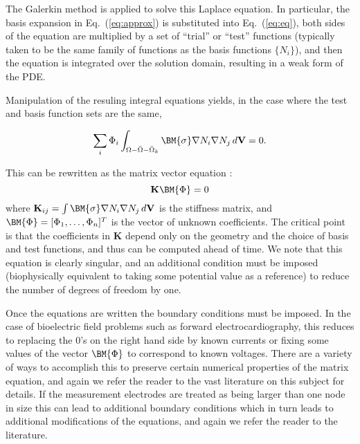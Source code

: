 The Galerkin method is applied to solve this Laplace equation. In
particular, the basis expansion in Eq.~(\ref{eq:approx}) is substituted
into Eq.~(\ref{eq:eq}), both sides of the equation are multiplied by a set
of ``trial'' or ``test'' functions (typically taken to be the same family of
functions as the basis functions $\{N_{i}\}$), and then the equation is
integrated over the solution domain, resulting in a weak form of the
PDE. 

Manipulation of the resuling integral equations yields, in the case where
the test and basis function sets are the same,

\begin{equation} \sum_i \Phi_i \int_{\Omega - \bar{\Omega} -
\bar{\Omega}_k} \BM{\sigma} \nabla N_i \nabla N_j \, d\mathbf{V} =
0. \label{eq:int_eq}
\end{equation}

This can be rewritten as the matrix vector equation :
\begin{equation} \mathbf{K} \BM{\Phi} = 0 \label{eq:mat_eq}
\end{equation}
%
where $\mathbf{K}_{ij} = \int \BM{\sigma} \nabla N_i \nabla N_j \,
d\mathbf{V}$ is the stiffness matrix, and $\BM{\Phi} = [\Phi_1,
\ldots, \Phi_n]^T$ is the vector of unknown coefficients. The critical
point is that the coefficients in $\mathbf{K}$ depend only on the geometry
and the choice of basis and test functions, and thus can be computed ahead
of time. We note that this equation is clearly singular, and an additional
condition must be imposed (biophysically equivalent to taking some
potential value as a reference) to reduce the number of degrees of freedom
by one.

Once the equations are written the boundary conditions must be imposed. In
the case of bioelectric field problems such as forward electrocardiography,
this reduces to replacing the $0$'s on the right hand side by known
currents or fixing some values of the vector $\BM{\Phi}$ to correspond to
known voltages. There are a variety of ways to accomplish this to preserve
certain numerical properties of the matrix equation, and again we refer the
reader to the vast literature on this subject for details. If the
measurement electrodes are treated as being larger than one node in size
this can lead to additional boundary conditions which in turn leads to
additional modifications of the equations, and again we refer the reader to
the literature.

